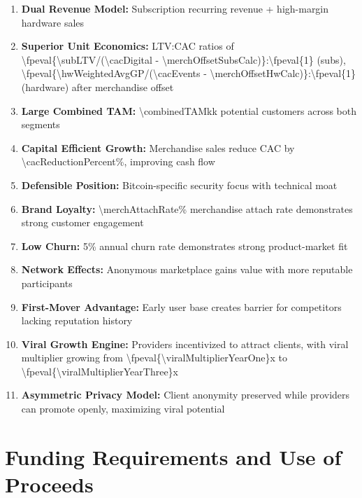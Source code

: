 \documentclass[11pt]{article}
\newcommand{\numfpeval}[1]{\num{\fpeval{#1}}}
\newcommand{\numint}[1]{\num[round-precision=0]{\fpeval{#1}}}
\begin{document}
\begin{enumerate}
  \item \textbf{Dual Revenue Model:} Subscription recurring revenue + high-margin hardware sales
  \item \textbf{Superior Unit Economics:} LTV:CAC ratios of \numint{\subLTV/(\cacDigital - \merchOffsetSubsCalc)}:\numint{1} (subs), \numint{\hwWeightedAvgGP/(\cacEvents - \merchOffsetHwCalc)}:\numint{1} (hardware) after merchandise offset
  \item \textbf{Large Combined TAM:} \num{\combinedTAMk}k potential customers across both segments
  \item \textbf{Capital Efficient Growth:} Merchandise sales reduce CAC by \num{\cacReductionPercent}\%, improving cash flow
  \item \textbf{Defensible Position:} Bitcoin-specific security focus with technical moat
  \item \textbf{Brand Loyalty:} \num{\merchAttachRate}\% merchandise attach rate demonstrates strong customer engagement
  \item \textbf{Low Churn:} \num{5}\% annual churn rate demonstrates strong product-market fit
  \item \textbf{Network Effects:} Anonymous marketplace gains value with more reputable participants
  \item \textbf{First-Mover Advantage:} Early user base creates barrier for competitors lacking reputation history
  \item \textbf{Viral Growth Engine:} Providers incentivized to attract clients, with viral multiplier growing from \numfpeval{\viralMultiplierYearOne}x to \numfpeval{\viralMultiplierYearThree}x\cite{parker2016}
  \item \textbf{Asymmetric Privacy Model:} Client anonymity preserved while providers can promote openly, maximizing viral potential\cite{hbs2016}
\end{enumerate}

\section{Funding Requirements and Use of Proceeds}
\end{document}
